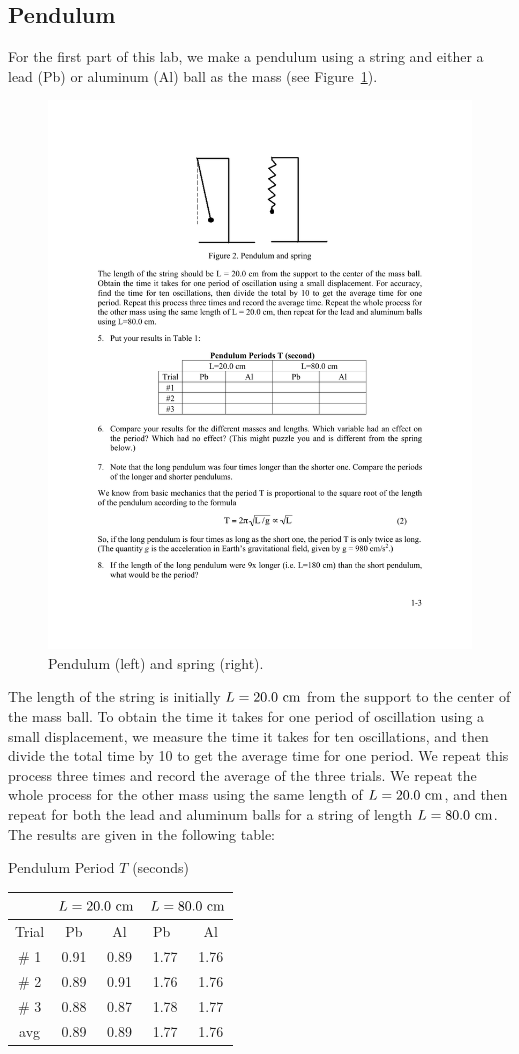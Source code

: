 \documentclass[11pt]{NSF}
\begin{document}
\subsection{Pendulum}

For the first part of this lab, we make a pendulum using a 
string and either a lead (Pb) or aluminum (Al) ball as the
mass (see Figure~\ref{f:2}).
%
\begin{figure}[hbtp]
\begin{center}
\includegraphics[width=.5\textwidth]{fig1_2}
\caption{Pendulum (left) and spring (right).}
\label{f:2}
\end{center}
\end{figure}
%
The length of the string is initially $L = 20.0~{\rm cm}$ 
from the support to the center of the mass ball. 
To obtain the time it takes for one period of 
oscillation using a small displacement, we measure the 
time it takes for ten oscillations, and then divide 
the total time by 10 to get the average time for one period. 
We repeat this process three times and record the average 
of the three trials. 
We repeat the whole process for the other mass using 
the same length of $L = 20.0~{\rm cm}$, and 
then repeat for both the lead and aluminum balls for a
string of length $L=80.0~{\rm cm}$.
The results are given in the following table:
%
\begin{table}[hbtp]
\begin{center}
Pendulum Period $T$ (seconds)\\
\begin{tabular}{| c | c | c | c | c | }
\hline
&\multicolumn{2}{c}{$L=20.0~{\rm cm}$} \vrule
&\multicolumn{2}{c}{$L=80.0~{\rm cm}$} \vrule\\
\hline
Trial & \phantom{ }Pb\phantom{ } & Al & \phantom{ }Pb\phantom{ }\  & Al \\
\hline
\# 1 & 0.91 & 0.89 & 1.77 & 1.76 \\
\hline
\# 2 & 0.89 & 0.91 & 1.76 & 1.76 \\
\hline
\# 3 & 0.88 & 0.87 & 1.78 & 1.77 \\
\hline
avg  & 0.89 & 0.89 & 1.77 & 1.76 \\
\hline
\end{tabular}
\label{t:1}
\end{center}
\end{table}
\end{document}
